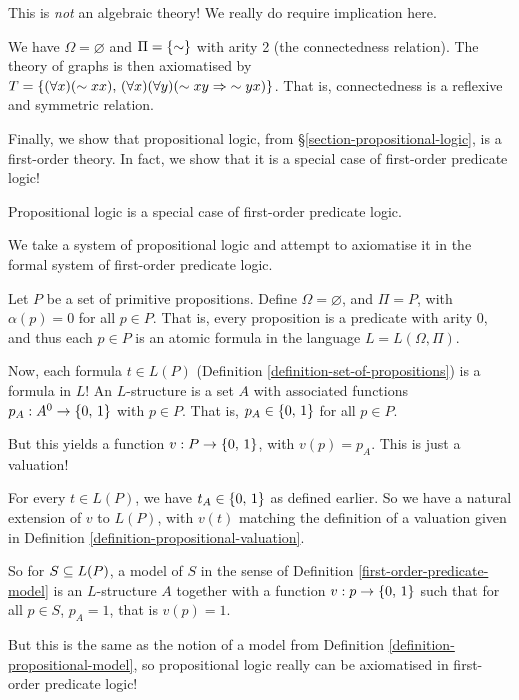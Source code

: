 \documentclass{article}
\begin{document}
\begin{note}
	This is \textit{not} an algebraic theory! We really do require implication here.
\end{note}

\begin{example}[Graphs]
    We have $\Omega = \varnothing$ and $\Pi = \left\lbrace \sim \right\rbrace$ with arity 2 (the connectedness relation). The theory of graphs is then axiomatised by $T = \left\lbrace (\forall x)(\sim xx), \, (\forall x)(\forall y)(\sim xy \Rightarrow \;\sim yx) \right\rbrace$. That is, connectedness is a reflexive and symmetric relation.
\end{example}

Finally, we show that propositional logic, from \S\ref{section-propositional-logic}, is a first-order theory. In fact, we show that it is a special case of first-order predicate logic!

\begin{proposition}
    Propositional logic is a special case of first-order predicate logic.
\end{proposition}

\begin{prf}
	We take a system of propositional logic and attempt to axiomatise it in the formal system of first-order predicate logic.
	
    Let $P$ be a set of primitive propositions. Define $\Omega = \varnothing$, and $\Pi = P$, with $\alpha(p) = 0$ for all $p \in P$. That is, every proposition is a predicate with arity 0, and thus each $p \in P$ is an atomic formula in the language $L = L(\Omega, \Pi)$.
    
    Now, each formula $t \in L(P)$ (Definition \ref{definition-set-of-propositions}) is a formula in $L$! An $L$-structure is a set $A$ with associated functions $p_A : A^0 \to \left\lbrace 0, \, 1 \right\rbrace$ with $p \in P$. That is, $p_A \in \left\lbrace 0, \, 1 \right\rbrace$ for all $p \in P$.
    
    But this yields a function $v : P \to \left\lbrace 0, \, 1 \right\rbrace$, with $v(p) = p_A$. This is just a valuation!
    
    For every $t \in L(P)$, we have $t_A \in \left\lbrace 0, \, 1 \right\rbrace$ as defined earlier. So we have a natural extension of $v$ to $L(P)$, with $v(t)$ matching the definition of a valuation given in Definition \ref{definition-propositional-valuation}.
    
    So for $S \subseteq L(P)$, a model of $S$ in the sense of Definition \ref{first-order-predicate-model} is an $L$-structure $A$ together with a function $v : p \to \left\lbrace 0, \, 1 \right\rbrace$ such that for all $p \in S$, $p_A = 1$, that is $v(p) = 1$.
    
    But this is the same as the notion of a model from Definition \ref{definition-propositional-model}, so propositional logic really can be axiomatised in first-order predicate logic!
\end{prf}
\end{document}
